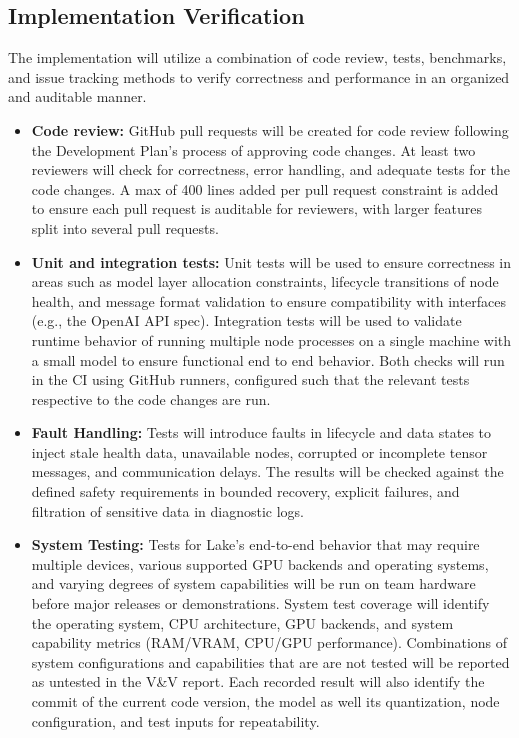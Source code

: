 \documentclass[12pt, titlepage]{article}
\begin{document}
\subsection{Implementation Verification}
\label{sec:ImpVer}
The implementation will utilize a combination of code review, tests, benchmarks, and issue tracking methods to verify correctness and performance in an organized and auditable manner.
\begin{itemize}
  \item \textbf{Code review:}
  GitHub pull requests will be created for code review following the Development Plan's process of approving code changes. At least two reviewers will check for correctness, error handling, and adequate tests for the code changes. A max of 400 lines added per pull request constraint is added to ensure each pull request is auditable for reviewers, with larger features split into several pull requests.

  \item \textbf{Unit and integration tests:}
  Unit tests will be used to ensure correctness in areas such as model layer allocation constraints, lifecycle transitions of node health, and message format validation to ensure compatibility with interfaces (e.g., the OpenAI API spec). Integration tests will be used to validate runtime behavior of running multiple node processes on a single machine with a small model to ensure functional end to end behavior. Both checks will run in the CI using GitHub runners, configured such that the relevant tests respective to the code changes are run.

  \item \textbf{Fault Handling:}
  Tests will introduce faults in lifecycle and data states to inject stale health data, unavailable nodes, corrupted or incomplete tensor messages, and communication delays. The results will be checked against the defined safety requirements in bounded recovery, explicit failures, and filtration of sensitive data in diagnostic logs.

  \item \textbf{System Testing:}
  Tests for Lake's end-to-end behavior that may require multiple devices, various supported GPU backends and operating systems, and varying degrees of system capabilities will be run on team hardware before major releases or demonstrations. System test coverage will identify the operating system, CPU architecture, GPU backends, and system capability metrics (RAM/VRAM, CPU/GPU performance). Combinations of system configurations and capabilities that are are not tested will be reported as untested in the V\&V report. Each recorded result will also identify the commit of the current code version, the model as well its quantization, node configuration, and test inputs for repeatability.


\end{itemize}
\end{document}
